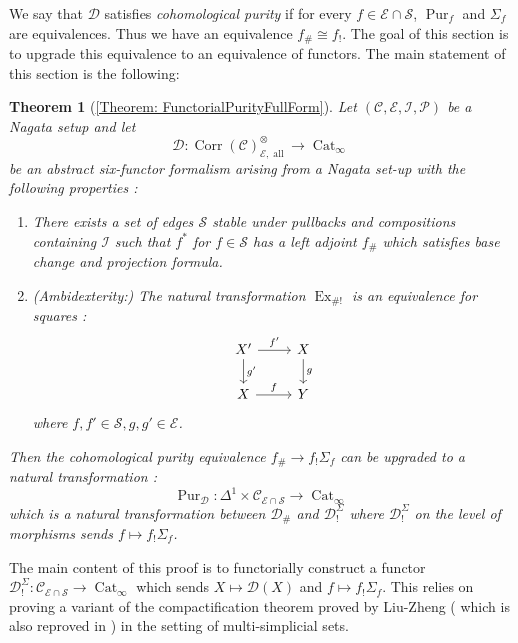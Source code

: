 \documentclass[14pt]{article}
\newtheorem{theorem}{Theorem}[subsection]
\theoremstyle{definition}
\newcommand{\E}{\mathcal{E}}
\newcommand{\D}{\mathcal{D}}
\renewcommand{\P}{\mathcal{P}}
\newcommand{\op}[1]{\operatorname{#1}}
\renewcommand{\S}{\mathcal{S}}
\newcommand{\I}{\mathscr{I}}
\newcommand{\Ca}{\mathcal{C}}
\numberwithin{subsection}{section}
\begin{document}
We say that $\D$ satisfies \textit{cohomological purity} if for every $f \in \E \cap \S$, $\op{Pur}_f$ and $\Sigma_f$ are equivalences. Thus we have an equivalence $f_{\#} \cong f_!$. The goal of this section is to upgrade this equivalence to an equivalence of functors. The main statement of this section is the following:
\begin{theorem}[\cref{Theorem: FunctorialPurityFullForm}]\label{Theorem: FunctorialPurityFullFormIntro}
  Let $(\Ca,\E,\I,\P)$ be a Nagata setup and let 
    \begin{equation}
        \D:  \op{Corr}(\Ca)^{\otimes}_{\E,\op{all}} \to \op{Cat}_{\infty}
         \end{equation}
        be an abstract six-functor formalism  arising from a Nagata set-up with the following properties :
        \begin{enumerate}
            \item There exists a set of edges $\mathcal{S}$ stable under pullbacks and compositions containing $\I$ such that $f^*$ for $f \in \S$ has a left adjoint $f_{\#}$ which satisfies base change and projection formula.
            \item (\textit{Ambidexterity:}) The natural transformation $\op{Ex}_{\#!}$ is an equivalence for squares :
            \begin{equation}
                \begin{tikzcd}
                    X' \arrow[r,"f'" ] \arrow[d,"g'"] & X \arrow[d,"g"]\\
                    X \arrow[r,"f"] & Y
                \end{tikzcd}
            \end{equation}
            where $f,f' \in \S, g,g' \in \E$.
         \end{enumerate}
        Then the cohomological purity equivalence $f_{\#} \to f_!\Sigma_f$ can be upgraded to a natural transformation :
        \begin{equation}
            \op{Pur}_{\D} : \Delta^1 \times \Ca_{\E \cap \S} \to \op{Cat}_{\infty}
        \end{equation}
        which is a natural transformation between $\D_{\#}$ and $\D^{\Sigma}_!$ where $\D^{\Sigma}_!$ on the level of morphisms sends $f \mapsto f_!\Sigma_f$.
\end{theorem}

The main content of this proof is to functorially construct a functor $\D^{\Sigma}_! : \Ca_{\E \cap \S} \to \op{Cat}_{\infty}$ which sends $X \mapsto \D(X)$ and $f \mapsto f_!\Sigma_f$. This relies on  proving a variant of the compactification theorem proved by Liu-Zheng (\cite[Theorem 1.5.1]{liu2017enhanced} which is also reproved in \cite[Thm B]{chowdhury2025sixfunctorformalismsii}) in the setting of multi-simplicial sets. 
\end{document}
